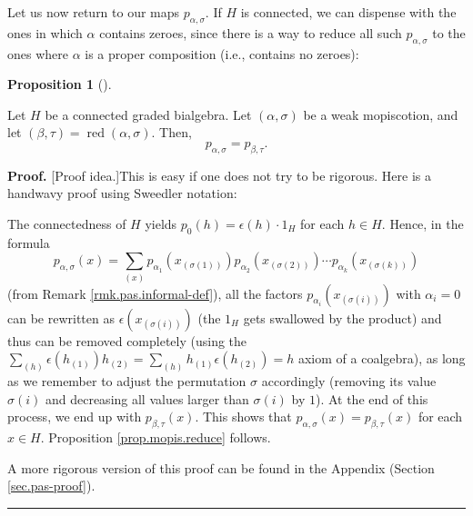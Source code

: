 \documentclass[numbers=enddot,12pt,final,onecolumn,notitlepage]{scrartcl}%
\theoremstyle{definition}
\newtheorem{prop}[theo]{Proposition}
\newenvironment{proposition}[1][]
{\begin{prop}[#1]\begin{leftbar}}
{\end{leftbar}\end{prop}}
\newenvironment{proof}[1][Proof]{\noindent\textbf{#1.} }{\ \rule{0.5em}{0.5em}}
\let\sumnonlimits\sum
\renewcommand{\sum}{\sumnonlimits\limits}
\begin{document}
Let us now return to our maps $p_{\alpha,\sigma}$. If $H$ is connected, we can
dispense with the ones in which $\alpha$ contains zeroes, since there is a way
to reduce all such $p_{\alpha,\sigma}$ to the ones where $\alpha$ is a proper
composition (i.e., contains no zeroes):

\begin{proposition}
\label{prop.mopis.reduce}Let $H$ be a connected graded bialgebra. Let $\left(
\alpha,\sigma\right)  $ be a weak mopiscotion, and let $\left(  \beta
,\tau\right)  =\operatorname*{red}\left(  \alpha,\sigma\right)  $. Then,%
\[
p_{\alpha,\sigma}=p_{\beta,\tau}.
\]

\end{proposition}

\begin{proof}
[Proof idea.]This is easy if one does not try to be rigorous. Here is a
handwavy proof using Sweedler notation:

The connectedness of $H$ yields $p_{0}\left(  h\right)  =\epsilon\left(
h\right)  \cdot1_{H}$ for each $h\in H$. Hence, in the formula
\[
p_{\alpha,\sigma}\left(  x\right)  =\sum_{\left(  x\right)  }p_{\alpha_{1}%
}\left(  x_{\left(  \sigma\left(  1\right)  \right)  }\right)  p_{\alpha_{2}%
}\left(  x_{\left(  \sigma\left(  2\right)  \right)  }\right)  \cdots
p_{\alpha_{k}}\left(  x_{\left(  \sigma\left(  k\right)  \right)  }\right)
\]
(from Remark \ref{rmk.pas.informal-def}), all the factors $p_{\alpha_{i}%
}\left(  x_{\left(  \sigma\left(  i\right)  \right)  }\right)  $ with
$\alpha_{i}=0$ can be rewritten as $\epsilon\left(  x_{\left(  \sigma\left(
i\right)  \right)  }\right)  $ (the $1_{H}$ gets swallowed by the product) and
thus can be removed completely (using the $\sum_{\left(  h\right)  }%
\epsilon\left(  h_{\left(  1\right)  }\right)  h_{\left(  2\right)  }%
=\sum_{\left(  h\right)  }h_{\left(  1\right)  }\epsilon\left(  h_{\left(
2\right)  }\right)  =h$ axiom of a coalgebra), as long as we remember to
adjust the permutation $\sigma$ accordingly (removing its value $\sigma\left(
i\right)  $ and decreasing all values larger than $\sigma\left(  i\right)  $
by $1$). At the end of this process, we end up with $p_{\beta,\tau}\left(
x\right)  $. This shows that $p_{\alpha,\sigma}\left(  x\right)
=p_{\beta,\tau}\left(  x\right)  $ for each $x\in H$. Proposition
\ref{prop.mopis.reduce} follows.

A more rigorous version of this proof can be found in the Appendix (Section
\ref{sec.pas-proof}).
\end{proof}
\end{document}

